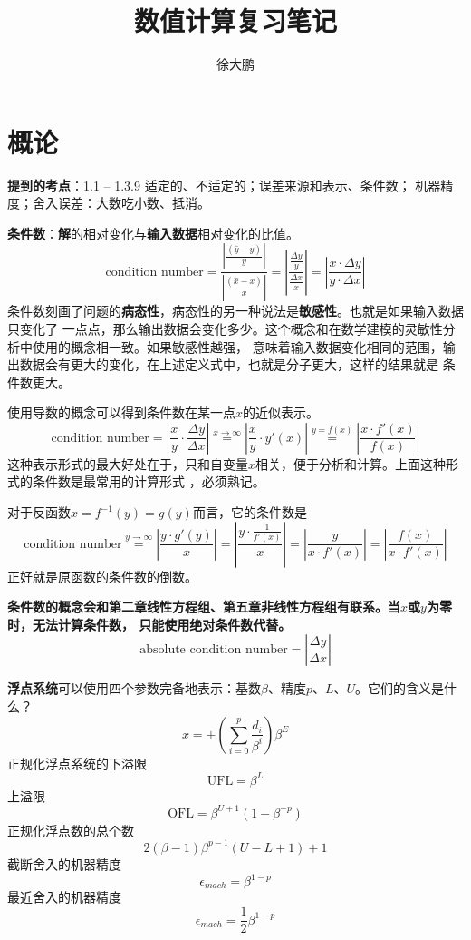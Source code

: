 \documentclass[14pt, letterpaper, UTF8, fontset=windowsnew, heading=true]{article}
\author{徐大鹏}
\title{数值计算复习笔记}
\providecommand{\abs}[1]{\left\vert#1\right\vert}
\begin{document}
\maketitle

\section{概论}
\textbf{提到的考点}：1.1 -- 1.3.9 适定的、不适定的；误差来源和表示、条件数；
机器精度；舍入误差：大数吃小数、抵消。
\par
\textbf{条件数}：\textbf{解}的相对变化与\textbf{输入数据}相对变化的比值。
$$\text{condition number}=\frac{\abs{\frac{(\hat{y}-y)}{y}}}{\abs{\frac{(\hat{x}-x)}{x}}}
=\left\vert\frac{\frac{\Delta y}{y}}{\frac{\Delta x}{x}}\right\vert
=\left\vert\frac{x\cdot\Delta y}{y\cdot\Delta x}\right\vert$$
条件数刻画了问题的\textbf{病态性}，病态性的另一种说法是\textbf{敏感性}。也就是如果输入数据只变化了
一点点，那么输出数据会变化多少。这个概念和在数学建模的灵敏性分析中使用的概念相一致。如果敏感性越强，
意味着输入数据变化相同的范围，输出数据会有更大的变化，在上述定义式中，也就是分子更大，这样的结果就是
条件数更大。
\par

使用导数的概念可以得到条件数在某一点$x$的近似表示。
$$\text{condition number}=\left\vert\frac{x}{y}\cdot\frac{\Delta y}{\Delta x}\right\vert
\stackrel{x\rightarrow \infty}{=}\left\vert\frac{x}{y}\cdot y'(x)\right\vert
\stackrel{y=f(x)}{=}\left\vert\frac{x\cdot f'(x)}{f(x)}\right\vert$$
这种表示形式的最大好处在于，只和自变量$x$相关，便于分析和计算。上面这种形式的条件数是最常用的计算形式
，必须熟记。
\par

对于反函数$x = f^{-1}(y) = g(y)$而言，它的条件数是
$$\text{condition number}\stackrel{y\rightarrow\infty}{=}\left\vert\frac{y\cdot g'(y)}{x}\right\vert
=\left\vert\frac{y\cdot \frac{1}{f'(x)}}{x}\right\vert
=\left\vert\frac{y}{x\cdot f'(x)}\right\vert
=\left\vert\frac{f(x)}{x\cdot f'(x)}\right\vert$$
正好就是原函数的条件数的倒数。
\par

\textbf{条件数的概念会和第二章线性方程组、第五章非线性方程组有联系。当$x$或$y$为零时，无法计算条件数，
只能使用绝对条件数代替。}$$\text{absolute condition number}=\left\vert\frac{\Delta y}{\Delta x}\right\vert$$
\par

\textbf{浮点系统}可以使用四个参数完备地表示：基数$\beta$、精度$p$、$L$、$U$。它们的含义是什么？
$$x=\pm\left( \sum_{i=0}^p\frac{d_i}{\beta^i} \right)\beta^E$$
正规化浮点系统的下溢限
$$\text{UFL}=\beta^L$$
上溢限
$$\text{OFL}=\beta^{U+1}(1-\beta^{-p})$$
正规化浮点数的总个数
$$2(\beta-1)\beta^{p-1}(U-L+1)+1$$
截断舍入的机器精度
$$\epsilon_{mach}=\beta^{1-p}$$
最近舍入的机器精度
$$\epsilon_{mach}=\frac{1}{2}\beta^{1-p}$$
\end{document}

